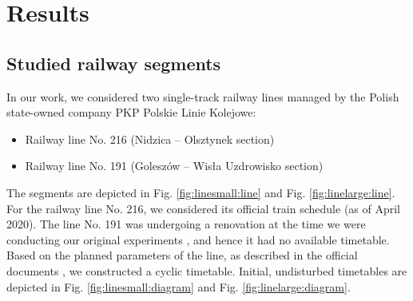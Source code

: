 \section{Results}

\subsection{Studied railway segments}
In our work, we considered two single-track railway lines managed by the Polish
state-owned company PKP Polskie Linie Kolejowe:

\begin{itemize}
  \item Railway line No. 216 (Nidzica -- Olsztynek section)
  \item Railway line No. 191 (Goleszów -- Wisła Uzdrowisko section)
\end{itemize}

The segments are depicted in Fig. \ref{fig:linesmall:line} and Fig.
\ref{fig:linelarge:line}. For the railway line No. 216, we considered its
official train schedule (as of April 2020). The line No. 191 was undergoing a
renovation at the time we were conducting our original experiments \cite{railwaydispatching}, and hence it had no available timetable.
Based on the planned parameters of the line, as described in the official
documents \cite{PKPPLK}, we constructed a cyclic timetable. Initial,
undisturbed timetables are depicted in Fig. \ref{fig:linesmall:diagram} and
Fig. \ref{fig:linelarge:diagram}.

